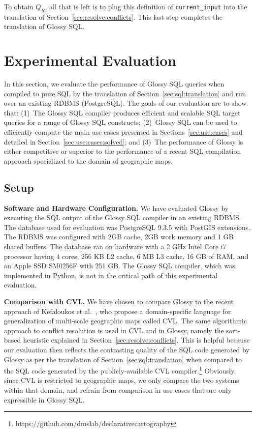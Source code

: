 \documentclass[11pt, oneside]{report}
\newcommand{\minisec}[1]{\noindent\textbf{#1.}}
\begin{document}
To obtain $Q_R$, all that is left is to plug  this definition of \texttt{current\_input} into the translation of Section~\ref{sec:resolve:conflicts}. This last step completes the translation of Glossy SQL.

\section{Experimental Evaluation}
\label{sec:experimental:evaluation}

In this section, we evaluate the performance of Glossy SQL queries when compiled to pure SQL by the  translation of Section~\ref{sec:sql:translation} and run over an existing RDBMS (PostgreSQL). The goals of our evaluation are to show that: 
(1)~The Glossy SQL compiler produces efficient and scalable SQL target queries for a range of Glossy SQL constructs; (2)~Glossy SQL can be used to efficiently compute the main use cases presented in Sections~\ref{sec:use:cases} and detailed in Section~\ref{sec:use:cases:solved}; and (3)~The performance of Glossy is either competitive or superior to the performance of a recent SQL compilation approach specialized to the domain of geographic maps. 


\subsection{Setup}
\minisec{Software and Hardware Configuration}
We have evaluated Glossy by executing the SQL output of the Glossy SQL compiler in an existing RDBMS. The database used for evaluation was PostgreSQL 9.3.5 with PostGIS extensions. The RDBMS was configured with 2GB cache, 2GB work memory and 1 GB shared buffers. The database ran on hardware with a 2 GHz Intel Core i7 processor having 4 cores, 256 KB L2 cache, 6 MB L3 cache, 16 GB of RAM, and an Apple SSD SM0256F with 251 GB. The Glossy SQL compiler, which was implemented in Python, is not in the critical path of this experimental evaluation.

\minisec{Comparison with CVL}
We have chosen to compare Glossy to the recent approach of Kefaloukos et al.~\cite{KefaloukosSZ14:CVL}, who propose a domain-specific language for generalization of multi-scale geographic maps called CVL. The same algorithmic approach to conflict resolution is used in CVL and in Glossy, namely the sort-based heuristic explained in Section~\ref{sec:resolve:conflicts}. This is helpful because our evaluation then reflects the contrasting quality of the SQL code generated by Glossy as per the translation of Section~\ref{sec:sql:translation} when compared to the SQL code generated by the publicly-available CVL compiler.\footnote{https://github.com/dmslab/declarativecartography} Obviously, since CVL is restricted to geographic maps, we only compare the two systems within that domain, and refrain from comparison in use cases that are only expressible in Glossy SQL.  
\end{document}
